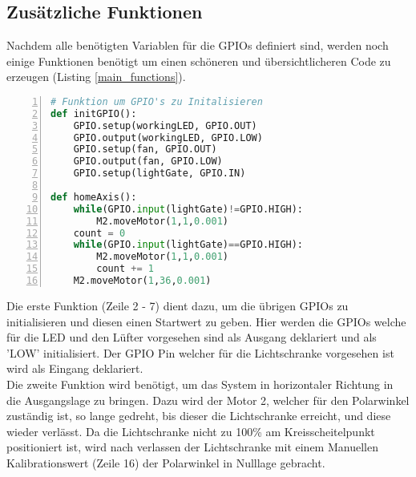 \subsection{Zusätzliche Funktionen}
Nachdem alle benötigten Variablen für die \acp{GPIO} definiert sind, werden noch einige Funktionen benötigt um einen schöneren und übersichtlicheren Code zu erzeugen (Listing \ref{main_functions}). 
\begin{lstlisting}[caption={Funktionen für die Übersichtlichkeit des Codes}, language={Python}, label={main_functions}, numbers=left]
# Funktion um GPIO's zu Initalisieren
def initGPIO():
    GPIO.setup(workingLED, GPIO.OUT)
    GPIO.output(workingLED, GPIO.LOW)
    GPIO.setup(fan, GPIO.OUT)
    GPIO.output(fan, GPIO.LOW)
    GPIO.setup(lightGate, GPIO.IN)

def homeAxis():
    while(GPIO.input(lightGate)!=GPIO.HIGH):
        M2.moveMotor(1,1,0.001)
    count = 0
    while(GPIO.input(lightGate)==GPIO.HIGH):
        M2.moveMotor(1,1,0.001)
        count += 1
    M2.moveMotor(1,36,0.001)
\end{lstlisting}
Die erste Funktion (Zeile 2 - 7) dient dazu, um die übrigen \acp{GPIO} zu initialisieren und diesen einen Startwert zu geben. Hier werden die \acp{GPIO} welche für die LED und den Lüfter vorgesehen sind als Ausgang deklariert und als 'LOW' initialisiert. Der \ac{GPIO} Pin welcher für die Lichtschranke vorgesehen ist wird als Eingang deklariert.\\
Die zweite Funktion wird benötigt, um das System in horizontaler Richtung in die Ausgangslage zu bringen. Dazu wird der Motor 2, welcher für den Polarwinkel zuständig ist, so lange gedreht, bis dieser die Lichtschranke erreicht, und diese wieder verlässt. Da die Lichtschranke nicht zu 100\% am Kreisscheitelpunkt positioniert ist, wird nach verlassen der Lichtschranke mit einem Manuellen Kalibrationswert (Zeile 16) der Polarwinkel in Nulllage gebracht.\\
